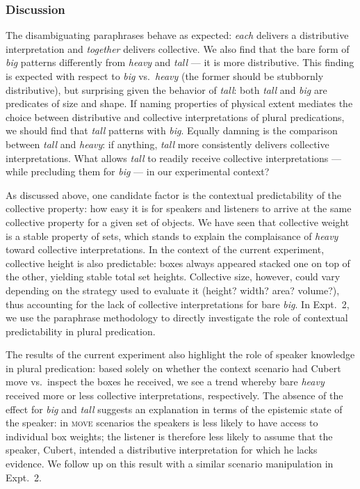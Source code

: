 \documentclass[linguex]{sp}
\begin{document}
\subsubsection{Discussion}

The disambiguating paraphrases behave as expected: \emph{each} delivers a distributive interpretation and \emph{together} delivers collective. We also find that the bare form of \emph{big} patterns differently from \emph{heavy} and \emph{tall} --- it is more distributive. This finding is expected with respect to \textit{big} vs.~\textit{heavy} (the former should be stubbornly distributive), but surprising given the behavior of \textit{tall}: both \emph{tall} and \emph{big} are predicates of size and shape. If naming properties of physical extent mediates the choice between distributive and collective interpretations of plural predications, we should find that \emph{tall} patterns with \emph{big}. Equally damning is the comparison between \emph{tall} and \emph{heavy}: if anything, \emph{tall} more consistently delivers collective interpretations. What allows \emph{tall} to readily receive collective interpretations --- while precluding them for \emph{big} --- in our experimental context? 

As discussed above, one candidate factor is the contextual predictability of the collective property: how easy it is for speakers and listeners to arrive at the same collective property for a given set of objects. We have seen that collective weight is a stable property of sets, which stands to explain the complaisance of \emph{heavy} toward collective interpretations. In the context of the current experiment, collective height is also predictable: boxes always appeared stacked one on top of the other, yielding stable total set heights. Collective size, however, could vary depending on the strategy used to evaluate it (height? width? area? volume?), thus accounting for the lack of collective interpretations for bare \emph{big}. In Expt.~2, we use the paraphrase methodology to directly investigate the role of contextual predictability in plural predication.

The results of the current experiment also highlight the role of speaker knowledge in plural predication: based solely on whether the context scenario had Cubert move vs.~inspect the boxes he received, we see a trend whereby bare \emph{heavy} received more or less collective interpretations, respectively. The absence of the effect for \emph{big} and \emph{tall} suggests an explanation in terms of the epistemic state of the speaker: in \textsc{move} scenarios the speakers is less likely to have access to individual box weights; the listener is therefore less likely to assume that the speaker, Cubert, intended a distributive interpretation for which he lacks evidence. We follow up on this result with a similar scenario manipulation in Expt.~2.
\end{document}
